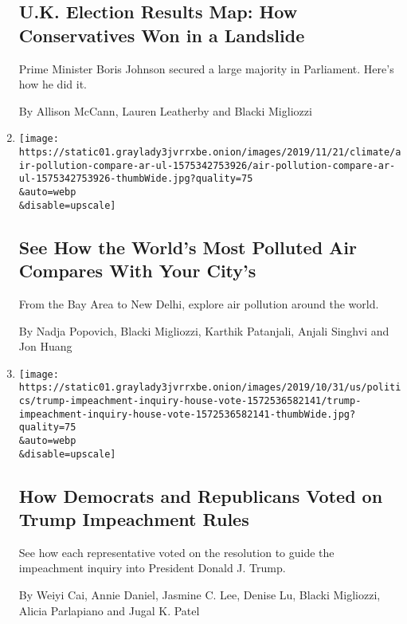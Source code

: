 \begin{enumerate}
  \hypertarget{uk-election-results-map-how-conservatives-won-in-a-landslide}{%
  \subsection{U.K. Election Results Map: How Conservatives Won in a
  Landslide}\label{uk-election-results-map-how-conservatives-won-in-a-landslide}}

  Prime Minister Boris Johnson secured a large majority in Parliament.
  Here's how he did it.

  By Allison McCann, Lauren Leatherby and Blacki Migliozzi
\item
  \href{/interactive/2019/12/02/climate/air-pollution-compare-ar-ul.html}{}

  \texttt{[image: https://static01.graylady3jvrrxbe.onion/images/2019/11/21/climate/air-pollution-compare-ar-ul-1575342753926/air-pollution-compare-ar-ul-1575342753926-thumbWide.jpg?quality=75\\\&auto=webp\\\&disable=upscale]}

  \hypertarget{see-how-the-worlds-most-polluted-air-compares-with-your-citys}{%
  \subsection{See How the World's Most Polluted Air Compares With Your
  City's}\label{see-how-the-worlds-most-polluted-air-compares-with-your-citys}}

  From the Bay Area to New Delhi, explore air pollution around the
  world.

  By Nadja Popovich, Blacki Migliozzi, Karthik Patanjali, Anjali Singhvi
  and Jon Huang
\item
  \href{/interactive/2019/10/31/us/politics/trump-impeachment-inquiry-house-vote.html}{}

  \texttt{[image: https://static01.graylady3jvrrxbe.onion/images/2019/10/31/us/politics/trump-impeachment-inquiry-house-vote-1572536582141/trump-impeachment-inquiry-house-vote-1572536582141-thumbWide.jpg?quality=75\\\&auto=webp\\\&disable=upscale]}

  \hypertarget{how-democrats-and-republicans-voted-on-trump-impeachment-rules}{%
  \subsection{How Democrats and Republicans Voted on Trump Impeachment
  Rules}\label{how-democrats-and-republicans-voted-on-trump-impeachment-rules}}

  See how each representative voted on the resolution to guide the
  impeachment inquiry into President Donald J. Trump.

  By Weiyi Cai, Annie Daniel, Jasmine C. Lee, Denise Lu, Blacki
  Migliozzi, Alicia Parlapiano and Jugal K. Patel
\end{enumerate}

